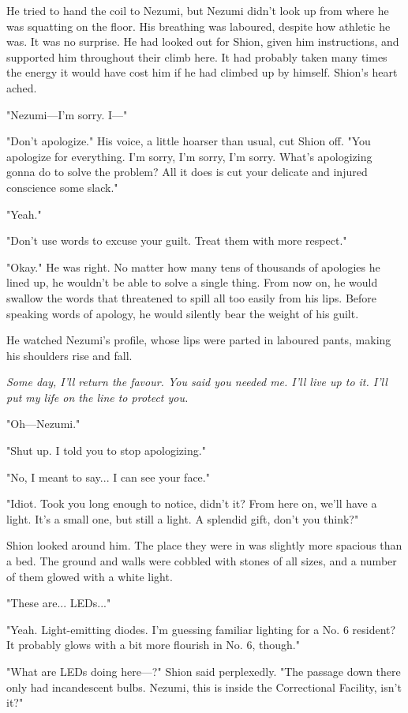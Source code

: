 He tried to hand the coil to Nezumi, but Nezumi didn't look up from
where he was squatting on the floor. His breathing was laboured, despite
how athletic he was. It was no surprise. He had looked out for Shion,
given him instructions, and supported him throughout their climb here.
It had probably taken many times the energy it would have cost him if he
had climbed up by himself. Shion's heart ached.

"Nezumi---I'm sorry. I---"

"Don't apologize." His voice, a little hoarser than usual, cut Shion
off. "You apologize for everything. I'm sorry, I'm sorry, I'm sorry.
What's apologizing gonna do to solve the problem? All it does is cut
your delicate and injured conscience some slack."

"Yeah."

"Don't use words to excuse your guilt. Treat them with more respect."

"Okay." He was right. No matter how many tens of thousands of apologies
he lined up, he wouldn't be able to solve a single thing. From now on,
he would swallow the words that threatened to spill all too easily from
his lips. Before speaking words of apology, he would silently bear the
weight of his guilt.

He watched Nezumi's profile, whose lips were parted in laboured pants,
making his shoulders rise and fall.

\emph{Some day, I'll return the favour. You said you needed me. I'll live up
to it. I'll put my life on the line to protect you.}

"Oh---Nezumi."

"Shut up. I told you to stop apologizing."

"No, I meant to say... I can see your face."

"Idiot. Took you long enough to notice, didn't it? From here on, we'll
have a light. It's a small one, but still a light. A splendid gift,
don't you think?"

Shion looked around him. The place they were in was slightly more
spacious than a bed. The ground and walls were cobbled with stones of
all sizes, and a number of them glowed with a white light.

"These are... LEDs..."

"Yeah. Light-emitting diodes. I'm guessing familiar lighting for a No. 6
resident? It probably glows with a bit more flourish in No. 6, though."

"What are LEDs doing here---?" Shion said perplexedly. "The passage down
there only had incandescent bulbs. Nezumi, this is inside the
Correctional Facility, isn't it?"

